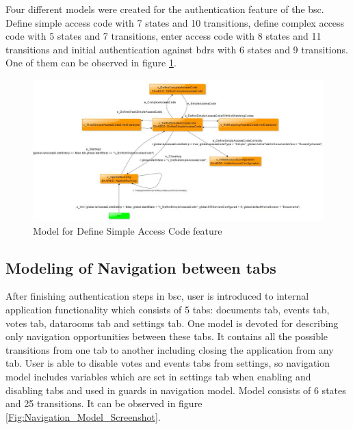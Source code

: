 \par
Four different models were created for the authentication feature of the \acrshort{bsc}. Define simple access code with 7 states and 10 transitions, define complex access code with 5 states and 7 transitions, enter access code with 8 states and 11 transitions and initial authentication against \acrshort{bdrs} with 6 states and 9 transitions. One of them can be observed in figure \ref{Fig:Authentication_Model_Screenshot}.

\begin{figure} [htbp!]
	\centering
					\includegraphics[width=1\textwidth]{figures/Authentication_model_screenshot}
					\caption{\label{Fig:Authentication_Model_Screenshot} Model for Define Simple Access Code feature}
\end{figure}

\subsection{Modeling of Navigation between tabs}
\par
After finishing authentication steps in \acrshort{bsc}, user is introduced to internal application functionality which consists of 5 tabs: documents tab, events tab, votes tab, datarooms tab and settings tab. One model is devoted for describing only navigation opportunities between these tabs. It contains all the possible transitions from one tab to another including closing the application from any tab. User is able to disable votes and events tabs from settings, so navigation model includes variables which are set in settings tab when enabling and disabling tabs and used in guards in navigation model. Model consists of 6 states and 25 transitions. It can be observed in figure \ref{Fig:Navigation_Model_Screenshot}.

